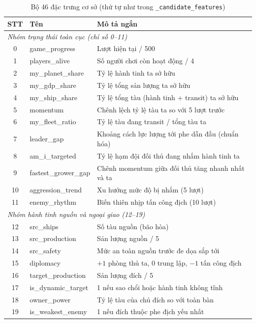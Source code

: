 \documentclass[conference]{IEEEtran}
\begin{document}
\begin{table}[htbp]
\caption{Bộ 46 đặc trưng cơ sở (thứ tự như trong \texttt{\_candidate\_features})}
\label{tab:features}
\centering
\small
\begin{tabular}{clp{8.5cm}}
\toprule
\textbf{STT} & \textbf{Tên} & \textbf{Mô tả ngắn} \\
\midrule
\multicolumn{3}{l}{\textit{Nhóm trạng thái toàn cục (chỉ số 0--11)}} \\
0 & game\_progress & Lượt hiện tại / 500 \\
1 & players\_alive & Số người chơi còn hoạt động / 4 \\
2 & my\_planet\_share & Tỷ lệ hành tinh ta sở hữu \\
3 & my\_gdp\_share & Tỷ lệ tổng sản lượng ta sở hữu \\
4 & my\_ship\_share & Tỷ lệ tổng tàu (hành tinh + transit) ta sở hữu \\
5 & momentum & Chênh lệch tỷ lệ tàu ta so với 5 lượt trước \\
6 & my\_fleet\_ratio & Tỷ lệ tàu đang transit / tổng tàu ta \\
7 & leader\_gap & Khoảng cách lực lượng tới phe dẫn đầu (chuẩn hóa) \\
8 & am\_i\_targeted & Tỷ lệ hạm đội đối thủ đang nhắm hành tinh ta \\
9 & fastest\_grower\_gap & Chênh momentum giữa đối thủ tăng nhanh nhất và ta \\
10 & aggression\_trend & Xu hướng mức độ bị nhắm (5 lượt) \\
11 & enemy\_rhythm & Biến thiên nhịp tấn công địch (10 lượt) \\
\midrule
\multicolumn{3}{l}{\textit{Nhóm hành tinh nguồn và ngoại giao (12--19)}} \\
12 & src\_ships & Số tàu nguồn (bão hòa) \\
13 & src\_production & Sản lượng nguồn / 5 \\
14 & src\_safety & Mức an toàn nguồn trước đe dọa sắp tới \\
15 & diplomacy & $+1$ phòng thủ ta, $0$ trung lập, $-1$ tấn công địch \\
16 & target\_production & Sản lượng đích / 5 \\
17 & is\_dynamic\_target & 1 nếu sao chổi hoặc hành tinh không tĩnh \\
18 & owner\_power & Tỷ lệ tàu của chủ đích so với toàn bàn \\
19 & is\_weakest\_enemy & 1 nếu đích thuộc phe địch yếu nhất \\

\end{tabular}
\end{table}
\end{document}
